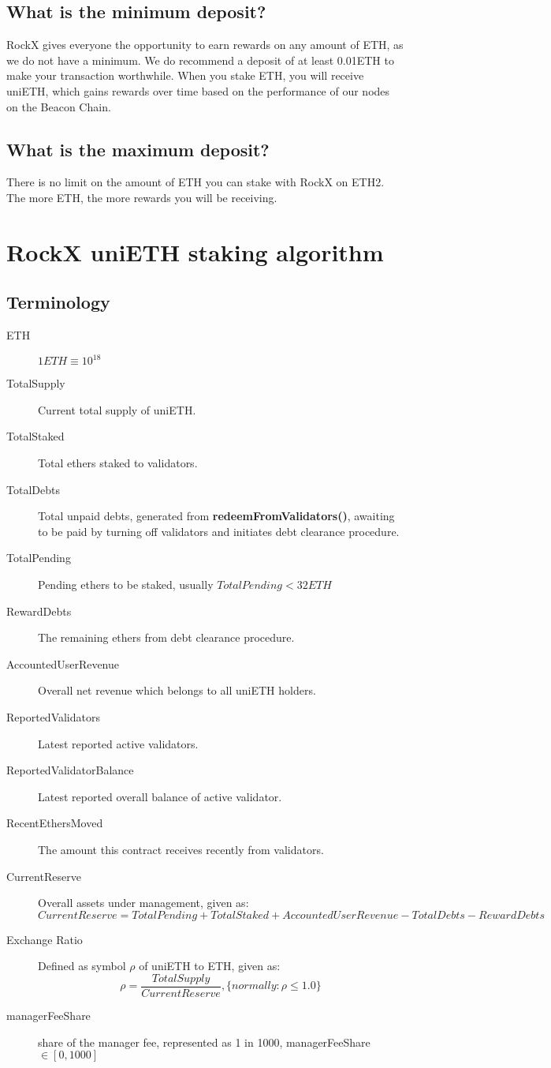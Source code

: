\documentclass{article}
\begin{document}
\subsection{What is the minimum deposit?}
RockX gives everyone the opportunity to earn rewards on any amount of ETH, as we do not have a minimum. We do recommend a deposit of at least 0.01ETH to make your transaction worthwhile. When you stake ETH, you will receive uniETH, which gains rewards over time based on the performance of our nodes on the Beacon Chain.

\subsection{What is the maximum deposit?}
There is no limit on the amount of ETH you can stake with RockX on ETH2. The more ETH, the more rewards you will be receiving.

\section{RockX uniETH staking algorithm}

\subsection{Terminology}
\begin{description}
   \item[ETH] $1 ETH \equiv 10^{18}$
   \item[TotalSupply] Current total supply of uniETH.
   \item[TotalStaked] Total ethers staked to validators.
   \item[TotalDebts] Total unpaid debts, generated from \textbf{redeemFromValidators()}, awaiting to be paid by turning off validators and initiates debt clearance procedure.
   \item[TotalPending] Pending ethers to be staked, usually $TotalPending <32ETH$
   \item[RewardDebts] The remaining ethers from debt clearance procedure.
   \item[AccountedUserRevenue] Overall net revenue which belongs to all uniETH holders.
   \item[ReportedValidators] Latest reported active validators.
   \item[ReportedValidatorBalance] Latest reported overall balance of active validator.
   \item[RecentEthersMoved] The amount this contract receives recently from validators.
   \item[CurrentReserve] Overall assets under management, given as:
   \[CurrentReserve = TotalPending + TotalStaked + AccountedUserRevenue - TotalDebts - RewardDebts\]
   \item[Exchange Ratio] Defined as symbol $\rho$ of uniETH to ETH, given as: 
    \[\rho = \frac{TotalSupply}{CurrentReserve} , \{normally: \rho \leq 1.0\} \]
   \item[managerFeeShare] share of the manager fee, represented as 1 in 1000, managerFeeShare $\in[0,1000]$ 
\end{description}
\end{document}
